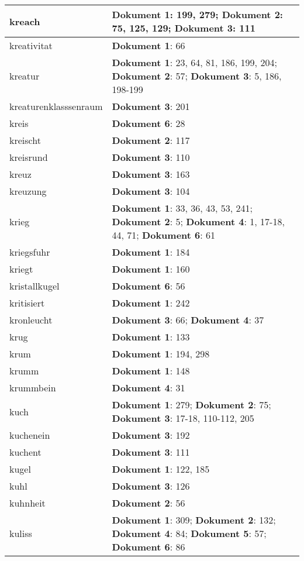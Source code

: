 \documentclass[a5paper]{article}
\begin{document}
\begin{longtable}[l]{|l|p{3in}|}
\hline
kreach & \textbf{Dokument 1}: 199, 279; \textbf{Dokument 2}: 75, 125, 129; \textbf{Dokument 3}: 111 \\
\hline
kreativitat & \textbf{Dokument 1}: 66 \\
\hline
kreatur & \textbf{Dokument 1}: 23, 64, 81, 186, 199, 204; \textbf{Dokument 2}: 57; \textbf{Dokument 3}: 5, 186, 198-199 \\
\hline
kreaturenklasssenraum & \textbf{Dokument 3}: 201 \\
\hline
kreis & \textbf{Dokument 6}: 28 \\
\hline
kreischt & \textbf{Dokument 2}: 117 \\
\hline
kreisrund & \textbf{Dokument 3}: 110 \\
\hline
kreuz & \textbf{Dokument 3}: 163 \\
\hline
kreuzung & \textbf{Dokument 3}: 104 \\
\hline
krieg & \textbf{Dokument 1}: 33, 36, 43, 53, 241; \textbf{Dokument 2}: 5; \textbf{Dokument 4}: 1, 17-18, 44, 71; \textbf{Dokument 6}: 61 \\
\hline
kriegsfuhr & \textbf{Dokument 1}: 184 \\
\hline
kriegt & \textbf{Dokument 1}: 160 \\
\hline
kristallkugel & \textbf{Dokument 6}: 56 \\
\hline
kritisiert & \textbf{Dokument 1}: 242 \\
\hline
kronleucht & \textbf{Dokument 3}: 66; \textbf{Dokument 4}: 37 \\
\hline
krug & \textbf{Dokument 1}: 133 \\
\hline
krum & \textbf{Dokument 1}: 194, 298 \\
\hline
krumm & \textbf{Dokument 1}: 148 \\
\hline
krummbein & \textbf{Dokument 4}: 31 \\
\hline
kuch & \textbf{Dokument 1}: 279; \textbf{Dokument 2}: 75; \textbf{Dokument 3}: 17-18, 110-112, 205 \\
\hline
kuchenein & \textbf{Dokument 3}: 192 \\
\hline
kuchent & \textbf{Dokument 3}: 111 \\
\hline
kugel & \textbf{Dokument 1}: 122, 185 \\
\hline
kuhl & \textbf{Dokument 3}: 126 \\
\hline
kuhnheit & \textbf{Dokument 2}: 56 \\
\hline
kuliss & \textbf{Dokument 1}: 309; \textbf{Dokument 2}: 132; \textbf{Dokument 4}: 84; \textbf{Dokument 5}: 57; \textbf{Dokument 6}: 86 \\

\end{longtable}
\end{document}
